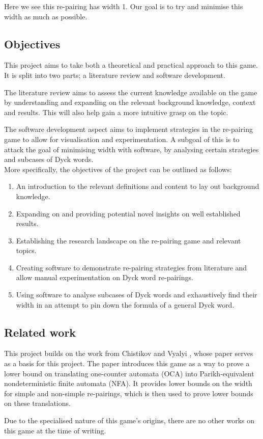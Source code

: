 \noindent Here we see this re-pairing has width 1. Our goal is to try and minimise this width as much as possible. 


\subsection{Objectives}

This project aims to take both a theoretical and practical approach to this game. It is split into two parts; a literature review and software development.

The literature review aims to assess the current knowledge available on the game by understanding and expanding on the relevant background knowledge, context and results. This will also help gain a more intuitive grasp on the topic. 

The software development aspect aims to implement strategies in the re-pairing game to allow for visualisation and experimentation. A subgoal of this is to attack the goal of minimising width with software, by analysing certain strategies and subcases of Dyck words. \\
More specifically, the objectives of the project can be outlined as follows:

\begin{enumerate}
    \item An introduction to the relevant definitions and content to lay out background knowledge.
    \item Expanding on and providing potential novel insights on well established results.
    \item Establishing the research landscape on the re-pairing game and relevant topics.
    \item Creating software to demonstrate re-pairing strategies from literature and allow manual experimentation on Dyck word re-pairings.
    \item Using software to analyse subcases of Dyck words and exhaustively find their width in an attempt to pin down the formula of a general Dyck word.
\end{enumerate}

\subsection{Related work}
This project builds on the work from Chistikov and Vyalyi \cite{chistikov2020re}, whose paper serves as a basis for this project. The paper introduces this game as a way to prove a lower bound on translating one-counter automata (OCA) into Parikh-equivalent nondeterministic finite automata (NFA). It provides lower bounds on the width for simple and non-simple re-pairings, which is then used to prove lower bounds on these translations.

Due to the specialised nature of this game's origins, there are no other works on this game at the time of writing.